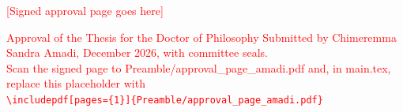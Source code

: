 \begin{titlepage}
\begin{center}
\vspace*{4cm}
\LARGE
\textcolor{red}{[Signed approval page goes here]}

\vspace{1cm}
\large
\textcolor{red}{Approval of the Thesis for the Doctor of Philosophy Submitted by Chimeremma Sandra Amadi, December 2026, with committee seals.\\
Scan the signed page to Preamble/approval\_page\_amadi.pdf and, in main.tex, replace this placeholder with\\
\texttt{\textbackslash includepdf[pages=\{1\}]\{Preamble/approval\_page\_amadi.pdf\}}}
\end{center}
\end{titlepage}
